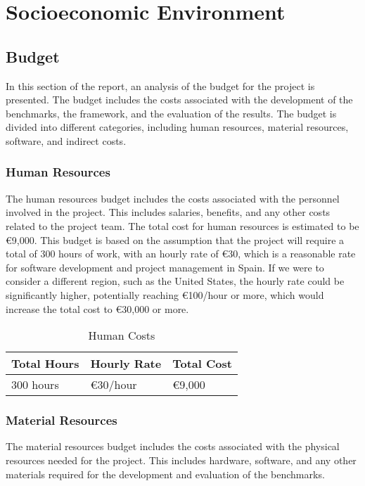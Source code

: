 \chapter{Socioeconomic Environment}\label{chap:economic-env}

\section{Budget}
In this section of the report, an analysis of the budget for the project is presented. The budget includes the costs associated with the development of the benchmarks, the framework, and the evaluation of the results. The budget is divided into different categories, including human resources, material resources, software, and indirect costs.

\subsection{Human Resources}
The human resources budget includes the costs associated with the personnel involved in the project. This includes salaries, benefits, and any other costs related to the project team. The total cost for human resources is estimated to be €9,000. This budget is based on the assumption that the project will require a total of 300 hours of work, with an hourly rate of €30, which is a reasonable rate for software development and project management in Spain. If we were to consider a different region, such as the United States, the hourly rate could be significantly higher, potentially reaching €100/hour or more, which would increase the total cost to €30,000 or more.

\begin{table}[h]
  \centering
  \begin{tabular}{lll}
    \textbf{Total Hours} & \textbf{Hourly Rate} & \textbf{Total Cost} \\
    \hline
    300 hours & €30/hour & €9,000 \\
  \end{tabular}
  \caption{Human Costs}
  \label{tab:human-resources}
\end{table}

\subsection{Material Resources}
The material resources budget includes the costs associated with the physical resources needed for the project. This includes hardware, software, and any other materials required for the development and evaluation of the benchmarks.

